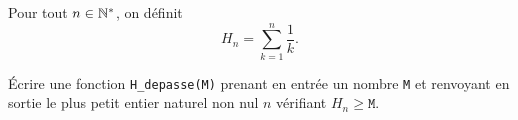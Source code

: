 Pour tout $n\in\mathbb{N}^\ast$, on définit
\begin{equation*}
  H_n = \sum_{k=1}^n \dfrac{1}{k}.
\end{equation*}

\bigskip{}

\question{} Écrire une fonction \texttt{H\_depasse(M)} prenant en entrée un nombre \texttt{M} et renvoyant en sortie le plus petit entier naturel non nul $n$ vérifiant $H_n \geq \texttt{M}$. 